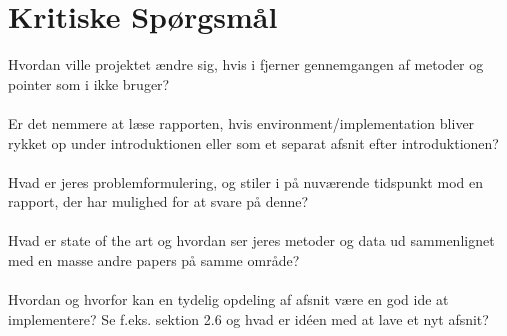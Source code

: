 \documentclass[11pt, fleqn, titlepage]{article}
\begin{document}
	\section*{Kritiske Spørgsmål}
	Hvordan ville projektet ændre sig, hvis i fjerner gennemgangen af metoder og pointer som i ikke bruger? \\\\
	\noindent Er det nemmere at læse rapporten, hvis environment/implementation bliver rykket op under introduktionen eller som et separat afsnit efter introduktionen? \\\\
	\noindent Hvad er jeres problemformulering, og stiler i på nuværende tidspunkt mod en rapport, der har mulighed for at svare på denne? \\\\
	\noindent Hvad er state of the art og hvordan ser jeres metoder og data ud sammenlignet med en masse andre papers på samme område? \\\\
	\noindent Hvordan og hvorfor kan en tydelig opdeling af afsnit være en god ide at implementere? Se f.eks. sektion 2.6 og hvad er idéen med at lave et nyt afsnit?
	
\end{document}
